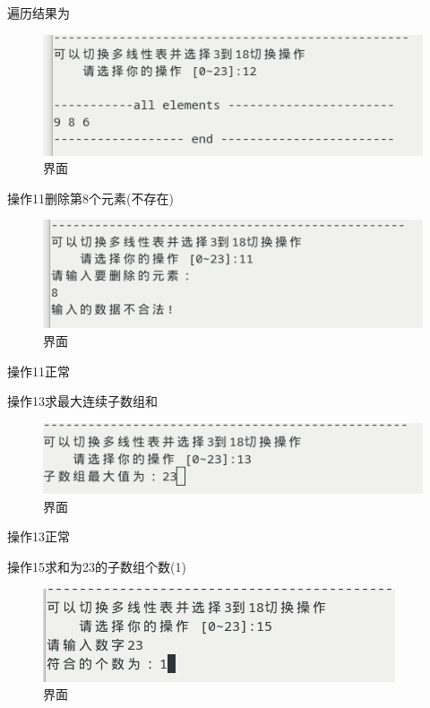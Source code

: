 \documentclass[supercite]{Experimental_Report}
\theoremstyle{definition}
\begin{document}
遍历结果为

\begin{figure}[!htb]
	\begin{center}
		\includegraphics[scale=0.60]{images/1-23.png}
		\caption{界面}
		\label{fig1-23}
		\end{center}
\end{figure}

操作11删除第8个元素(不存在)

\begin{figure}[!htb]
	\begin{center}
		\includegraphics[scale=0.60]{images/1-24.png}
		\caption{界面}
		\label{fig1-24}
		\end{center}
\end{figure}

操作11正常

操作13求最大连续子数组和

\begin{figure}[!htb]
	\begin{center}
		\includegraphics[scale=0.60]{images/1-25.png}
		\caption{界面}
		\label{fig1-25}
		\end{center}
\end{figure}

操作13正常

操作15求和为23的子数组个数(1)

\begin{figure}[!htb]
	\begin{center}
		\includegraphics[scale=0.60]{images/1-26.png}
		\caption{界面}
		\label{fig1-26}
		\end{center}
\end{figure}
\end{document}
